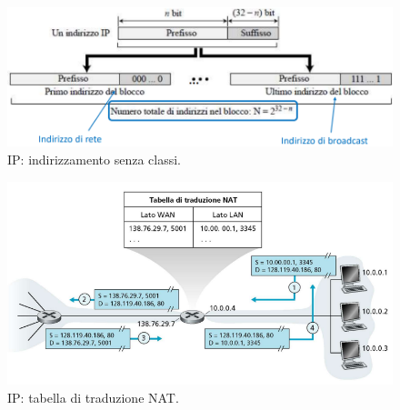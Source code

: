 \documentclass[11pt, italian, openany]{book}
\begin{document}
\begin{sloppypar}
\begin{figure}[!h]
	\centering
	\includegraphics[scale=0.5]{images/ip-classless-addressing.png}
	\caption{IP: indirizzamento senza classi.}
	\label{fig:ip-classless-addressing}
\end{figure}

\pagebreak

\begin{figure}[!h]
	\centering
	\includegraphics[scale=0.5]{images/ip-tabella-nat.png}
	\caption{IP: tabella di traduzione NAT.}
	\label{fig:ip-nat}
\end{figure}


\end{sloppypar}
\end{document}
